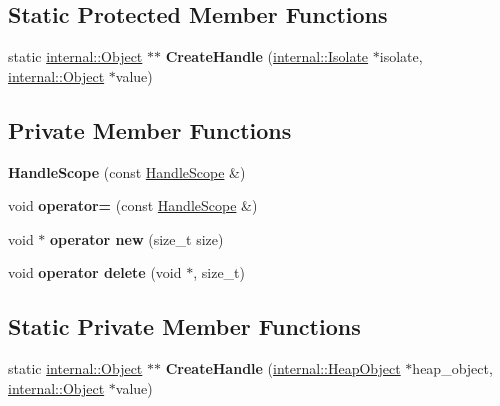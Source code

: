 \subsection*{Static Protected Member Functions}
\begin{DoxyCompactItemize}
\item 
static \hyperlink{classv8_1_1internal_1_1_object}{internal\+::\+Object} $\ast$$\ast$ {\bfseries Create\+Handle} (\hyperlink{classv8_1_1internal_1_1_isolate}{internal\+::\+Isolate} $\ast$isolate, \hyperlink{classv8_1_1internal_1_1_object}{internal\+::\+Object} $\ast$value)\hypertarget{classv8_1_1_handle_scope_a8a75b255c8ea85af0741954eead40c68}{}\label{classv8_1_1_handle_scope_a8a75b255c8ea85af0741954eead40c68}

\end{DoxyCompactItemize}
\subsection*{Private Member Functions}
\begin{DoxyCompactItemize}
\item 
{\bfseries Handle\+Scope} (const \hyperlink{classv8_1_1_handle_scope}{Handle\+Scope} \&)\hypertarget{classv8_1_1_handle_scope_a7c62e10404e105ec74b86b5d7d5e04fe}{}\label{classv8_1_1_handle_scope_a7c62e10404e105ec74b86b5d7d5e04fe}

\item 
void {\bfseries operator=} (const \hyperlink{classv8_1_1_handle_scope}{Handle\+Scope} \&)\hypertarget{classv8_1_1_handle_scope_a1529e8892e4ec96a845f6dea18f2c2ec}{}\label{classv8_1_1_handle_scope_a1529e8892e4ec96a845f6dea18f2c2ec}

\item 
void $\ast$ {\bfseries operator new} (size\+\_\+t size)\hypertarget{classv8_1_1_handle_scope_a1dd92d6bbc0bf64a66f968e08dad00a2}{}\label{classv8_1_1_handle_scope_a1dd92d6bbc0bf64a66f968e08dad00a2}

\item 
void {\bfseries operator delete} (void $\ast$, size\+\_\+t)\hypertarget{classv8_1_1_handle_scope_ab8ba9daf1a4af951e258c1d4a0f7257c}{}\label{classv8_1_1_handle_scope_ab8ba9daf1a4af951e258c1d4a0f7257c}

\end{DoxyCompactItemize}
\subsection*{Static Private Member Functions}
\begin{DoxyCompactItemize}
\item 
static \hyperlink{classv8_1_1internal_1_1_object}{internal\+::\+Object} $\ast$$\ast$ {\bfseries Create\+Handle} (\hyperlink{classv8_1_1internal_1_1_heap_object}{internal\+::\+Heap\+Object} $\ast$heap\+\_\+object, \hyperlink{classv8_1_1internal_1_1_object}{internal\+::\+Object} $\ast$value)\hypertarget{classv8_1_1_handle_scope_a6a13a0681b7370f5ac79c1371aff0ca3}{}\label{classv8_1_1_handle_scope_a6a13a0681b7370f5ac79c1371aff0ca3}

\end{DoxyCompactItemize}
